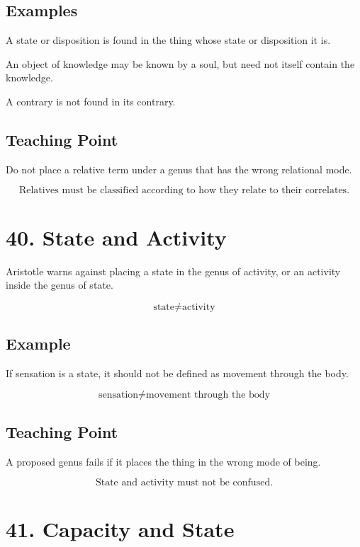 \documentclass[12pt]{article}
\begin{document}
\subsection*{Examples}

A state or disposition is found in the thing whose state or disposition it is.

An object of knowledge may be known by a soul, but need not itself contain the
knowledge.

A contrary is not found in its contrary.

\subsection*{Teaching Point}

Do not place a relative term under a genus that has the wrong relational mode.

\[
\boxed{
\text{Relatives must be classified according to how they relate to their correlates.}
}
\]

\section*{40. State and Activity}

Aristotle warns against placing a state in the genus of activity, or an activity
inside the genus of state.

\[
\text{state} \neq \text{activity}
\]

\subsection*{Example}

If sensation is a state, it should not be defined as movement through the body.

\[
\text{sensation} \neq \text{movement through the body}
\]

\subsection*{Teaching Point}

A proposed genus fails if it places the thing in the wrong mode of being.

\[
\boxed{
\text{State and activity must not be confused.}
}
\]

\section*{41. Capacity and State}
\end{document}
